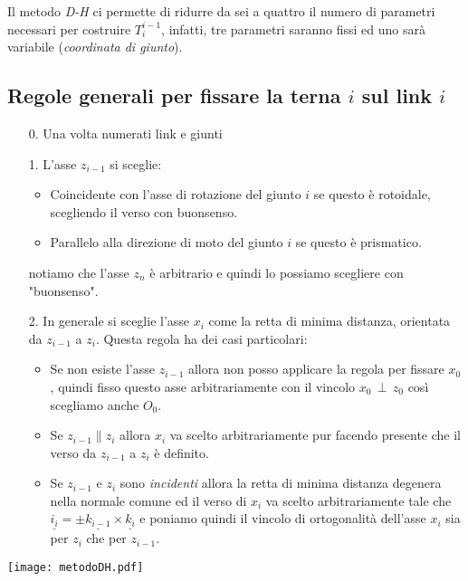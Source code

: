 Il metodo \emph{D-H} ci permette di ridurre da sei a quattro il numero di parametri necessari per costruire $T_i^{i-1}$, infatti, tre parametri saranno fissi ed uno sarà variabile (\emph{coordinata di giunto}).

\subsection{Regole generali per fissare la terna $i$ sul link $i$}
\begin{enumerate}
	\item[0.] Una volta numerati link e giunti
	\item[1.] L'asse $z_{i-1}$ si sceglie:
	\begin{itemize}
		\item Coincidente con l'asse di rotazione del giunto $i$ se questo è rotoidale, scegliendo il verso con buonsenso.
		\item Parallelo alla direzione di moto del giunto $i$ se questo è prismatico.
	\end{itemize}
	notiamo che l'asse $z_n$ è arbitrario e quindi lo possiamo scegliere con "buonsenso".
	\item[2.]In generale si sceglie l'asse $x_i$ come la retta di minima distanza, orientata da $z_{i-1}$ a $z_i$. Questa regola ha dei casi particolari:
	\begin{itemize}
		\item Se non esiste l'asse $z_{i-1}$ allora non posso applicare la regola per fissare $x_0$, quindi fisso questo asse arbitrariamente con il vincolo $x_{0}\,\perp\,z_{0}$ così scegliamo anche $O_0$.
		\item Se $z_{i-1}\parallel z_i$ allora $x_i$ va scelto arbitrariamente pur facendo presente che il verso da $z_{i-1}$ a $z_i$ è definito.
		\item Se $z_{i-1}$ e $z_i$ sono \emph{incidenti} allora la retta di minima distanza degenera nella normale comune ed il verso di $x_i$ va scelto arbitrariamente tale che $\underline{i_i} = \pm \underline{k_{i-1}} \times \underline{k_i}$ e poniamo quindi il vincolo di ortogonalità dell'asse $x_i$ sia per $z_i$ che per $z_{i-1}$.
	\end{itemize}
\end{enumerate}

\texttt{[image: metodoDH.pdf]}

